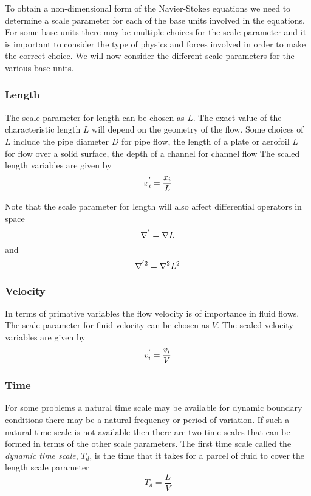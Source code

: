 To obtain a non-dimensional form of the Navier-Stokes equations we
need to determine a scale parameter for each of the base units
involved in the equations. For some base units there may be multiple
choices for the scale parameter and it is important to consider the
type of physics and forces involved in order to make the correct
choice. We will now consider the different scale parameters for the
various base units.

\subsubsection{Length}
The scale parameter for length can be chosen as $L$. The exact value
of the characteristic length $L$ will depend on the geometry of the
flow. Some choices of $L$ include the pipe diameter $D$ for pipe flow,
the length of a plate or aerofoil $L$ for flow over a solid surface,
the depth of a channel for channel flow \etc The scaled length variables are given by
\begin{equation}
   {x}^{'} _{i}=\dfrac{x_{i}}{L}
\end{equation}

Note that the scale parameter for length will also affect differential operators in space \ie
\begin{equation}
    {\nabla}^{'}   =  \nabla  L
\end{equation}
and
\begin{equation}
    {\nabla}^{'2}   =  \nabla^{2}  L^{2}
\end{equation}

\subsubsection{Velocity}
In terms of primative variables the flow velocity is of importance in
fluid flows. The scale parameter for fluid velocity can be chosen as
$V$. The scaled velocity variables are given by
\begin{equation}
   {v}^{'} _{i}=\dfrac{v_{i}}{V}
\end{equation}

\subsubsection{Time}
For some problems a natural time scale may be available \eg for
dynamic boundary conditions there may be a natural frequency or period
of variation. If such a natural time scale is not available then there
are two time scales that can be formed in terms of the other scale
parameters. The first time scale called the \emph{dynamic time scale},
$T_{d}$, is the time that it takes for a parcel of fluid to cover the
length scale parameter \ie
\begin{equation}
  T_{d}=\dfrac{L}{V}
\end{equation}

